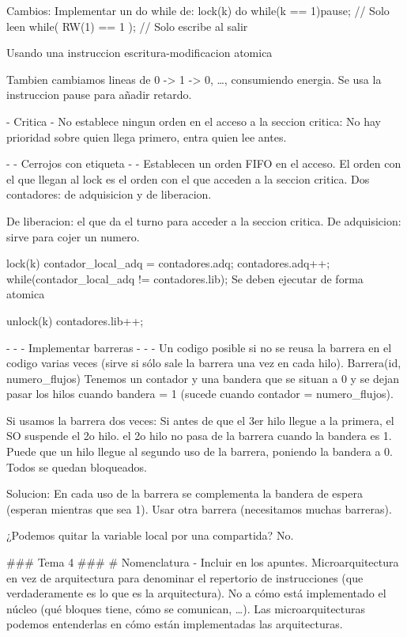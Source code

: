 Cambios:
Implementar un do while de:
lock(k){
    do{
        while(k == 1){pause;}    // Solo leen
    }while( RW(1) == 1 );   // Solo escribe al salir
}

Usando una instruccion escritura-modificacion atomica

Tambien cambiamos lineas de 0 -> 1 -> 0, \ldots, consumiendo energia.
Se usa la instruccion pause para añadir retardo.

- Critica -
No establece ningun orden en el acceso a la seccion critica: No hay prioridad sobre quien llega primero, entra quien lee antes.

- - Cerrojos con etiqueta - -
Establecen un orden FIFO en el acceso.
El orden con el que llegan al lock es el orden con el que acceden a la seccion critica.
Dos contadores: de adquisicion y de liberacion.

De liberacion: el que da el turno para acceder a la seccion critica. De adquisicion: sirve para cojer un numero.

lock(k){
    contador_local_adq = contadores.adq;
    contadores.adq++;
    while(contador_local_adq != contadores.lib){;}
}
Se deben ejecutar de forma atomica

unlock(k){
    contadores.lib++;
}


- - - Implementar barreras - - -
Un codigo posible si no se reusa la barrera en el codigo varias veces (sirve si sólo sale la barrera una vez en cada hilo).
Barrera(id, numero_flujos)
Tenemos un contador y una bandera que se situan a 0 y se dejan pasar los hilos cuando bandera = 1 (sucede cuando contador = numero_flujos).

Si usamos la barrera dos veces:
Si antes de que el 3er hilo llegue a la primera, el SO suspende el 2o hilo. el 2o hilo no pasa de la barrera cuando la bandera es 1. Puede que un hilo llegue al segundo uso de la barrera, poniendo la bandera a 0. Todos se quedan bloqueados.

Solucion:
En cada uso de la barrera se complementa la bandera de espera (esperan mientras que sea 1).
Usar otra barrera (necesitamos muchas barreras).

¿Podemos quitar la variable local por una compartida?
No.


### Tema 4 ###
# Nomenclatura - Incluir en los apuntes.
Microarquitectura en vez de arquitectura para denominar el repertorio de instrucciones (que verdaderamente es lo que es la arquitectura). No a cómo está implementado el núcleo (qué bloques tiene, cómo se comunican, \ldots).
Las microarquitecturas podemos entenderlas en cómo están implementadas las arquitecturas.

